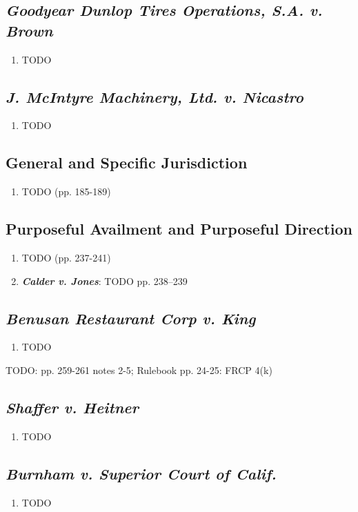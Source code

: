 \subsection{\emph{Goodyear Dunlop Tires Operations, S.A. v. Brown}}

\begin{enumerate}
    \item TODO
\end{enumerate}

\subsection{\emph{J. McIntyre Machinery, Ltd. v. Nicastro}}

\begin{enumerate}
    \item TODO
\end{enumerate}

\subsection{General and Specific Jurisdiction}

\begin{enumerate}
    \item TODO (pp. 185-189)
\end{enumerate}

\subsection{Purposeful Availment and Purposeful Direction}

\begin{enumerate}
    \item TODO (pp. 237-241)
    \item \textbf{\emph{Calder v. Jones}}: TODO pp. 238--239
\end{enumerate}

\subsection{\emph{Benusan Restaurant Corp v. King}}

\begin{enumerate}
    \item TODO
\end{enumerate}

TODO: pp. 259-261 notes 2-5; Rulebook pp. 24-25: FRCP 4(k)

\subsection{\emph{Shaffer v. Heitner}}

\begin{enumerate}
    \item TODO
\end{enumerate}

\subsection{\emph{Burnham v. Superior Court of Calif.}}

\begin{enumerate}
    \item TODO
\end{enumerate}

